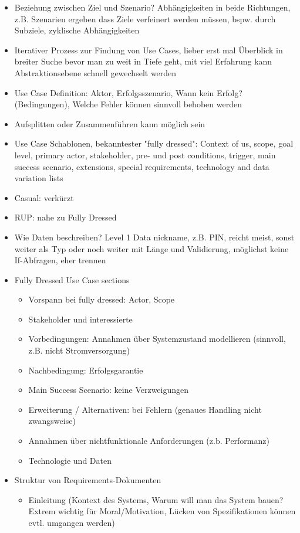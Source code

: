 \documentclass[paper=a4, fontsize=11pt]{scrartcl} %
\numberwithin{equation}{section} %
\numberwithin{figure}{section} %
\numberwithin{table}{section} %
\begin{document}
\begin{itemize}
\begin{itemize}
    \item Beziehung zwischen Ziel und Szenario? Abhängigkeiten in beide Richtungen, z.B. Szenarien ergeben dass Ziele verfeinert werden müssen, bspw. durch Subziele, zyklische Abhängigkeiten
    \item Iterativer Prozess zur Findung von Use Cases, lieber erst mal Überblick in breiter Suche bevor man zu weit in Tiefe geht, mit viel Erfahrung kann Abstraktionsebene schnell gewechselt werden
    \item Use Case Definition: Aktor, Erfolgsszenario, Wann kein Erfolg? (Bedingungen), Welche Fehler können sinnvoll behoben werden
    \item Aufsplitten oder Zusammenführen kann möglich sein
    \item Use Case Schablonen, bekanntester "fully dressed": Context of us, scope, goal level, primary actor, stakeholder, pre- und post conditions, trigger, main success scenario, extensions, special requirements, technology and data variation lists
    \item Casual: verkürzt
    \item RUP: nahe zu Fully Dressed
    \item Wie Daten beschreiben? Level 1 Data nickname, z.B. PIN, reicht meist, sonst weiter als Typ oder noch weiter mit Länge und Validierung, möglichst keine If-Abfragen, eher trennen
    \item Fully Dressed Use Case sections
    \begin{itemize}
      \item Vorspann bei fully dressed: Actor, Scope
      \item Stakeholder und interessierte
      \item Vorbedingungen: Annahmen über Systemzustand modellieren (sinnvoll, z.B. nicht Stromversorgung)
      \item Nachbedingung: Erfolgsgarantie
      \item Main Success Scenario: keine Verzweigungen
      \item Erweiterung / Alternativen: bei Fehlern (genaues Handling nicht zwangsweise)
      \item Annahmen über nichtfunktionale Anforderungen (z.b. Performanz)
      \item Technologie und Daten
    \end{itemize}
    \item Struktur von Requirements-Dokumenten
    \begin{itemize}
      \item Einleitung (Kontext des Systems, Warum will man das System bauen? Extrem wichtig für Moral/Motivation, Lücken von Spezifikationen können evtl. umgangen werden)

\end{itemize}
\end{itemize}
\end{itemize}
\end{document}
